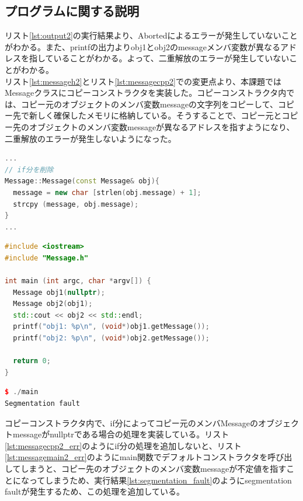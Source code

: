 \documentclass[paper=a4,fontsize=11pt]{jlreq}
\begin{document}
\subsection{プログラムに関する説明}
リスト\ref{lst:output2}の実行結果より、Abortedによるエラーが発生していないことがわかる。また、printfの出力よりobj1とobj2のmessageメンバ変数が異なるアドレスを指していることがわかる。よって、二重解放のエラーが発生していないことがわかる。\\
リスト\ref{lst:messageh2}とリスト\ref{lst:messagecpp2}での変更点より、本課題ではMessageクラスにコピーコンストラクタを実装した。コピーコンストラクタ内では、コピー元のオブジェクトのメンバ変数messageの文字列をコピーして、コピー先で新しく確保したメモリに格納している。そうすることで、コピー元とコピー先のオブジェクトのメンバ変数messageが異なるアドレスを指すようになり、二重解放のエラーが発生しないようになった。\\

\begin{lstlisting}[language=C++, caption=Message.cpp (課題2のコピーコンストラクタのエラー例), label=lst:messagecpp2_err]
...
// if分を削除
Message::Message(const Message& obj){
  message = new char [strlen(obj.message) + 1];
  strcpy (message, obj.message);
}
...
\end{lstlisting}

\begin{lstlisting}[language=C++, caption=main.cpp (課題2のコピーコンストラクタのエラー例), label=lst:edit_maincpp2]
#include <iostream>
#include "Message.h"

int main (int argc, char *argv[]) {
  Message obj1(nullptr);
  Message obj2(obj1);
  std::cout << obj2 << std::endl;
  printf("obj1: %p\n", (void*)obj1.getMessage());
  printf("obj2: %p\n", (void*)obj2.getMessage());

  return 0;
}
\end{lstlisting}


\begin{lstlisting}[language=C++, caption=実行結果 (segmentation fault), label=lst:segmentation_fault]
$ ./main
Segmentation fault
\end{lstlisting}

コピーコンストラクタ内で、if分によってコピー元のメンバMessageのオブジェクトmessageがnullptrである場合の処理を実装している。リスト\ref{lst:messagecpp2_err}のようにif分の処理を追加しないと、リスト\ref{lst:messagemain2_err}のようにmain関数でデフォルトコンストラクタを呼び出してしまうと、コピー先のオブジェクトのメンバ変数messageが不定値を指すことになってしまうため、実行結果\ref{lst:segmentation_fault}のようにsegmentation faultが発生するため、この処理を追加している。
\end{document}

